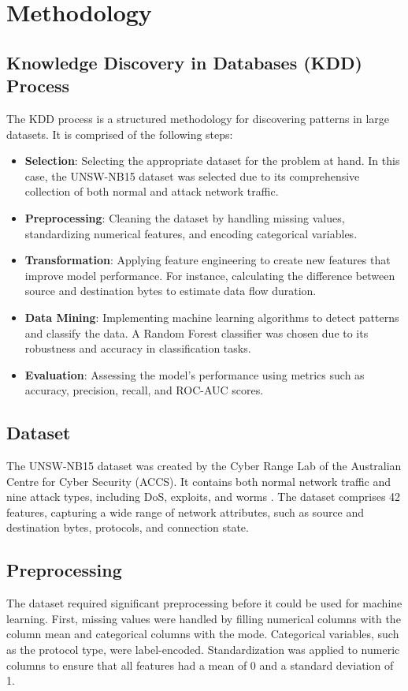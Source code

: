 \documentclass[12pt]{article}
\begin{document}
\section{Methodology}

\subsection{Knowledge Discovery in Databases (KDD) Process}
The KDD process is a structured methodology for discovering patterns in large datasets. It is comprised of the following steps:

\begin{itemize}
    \item \textbf{Selection}: Selecting the appropriate dataset for the problem at hand. In this case, the UNSW-NB15 dataset was selected due to its comprehensive collection of both normal and attack network traffic.
    \item \textbf{Preprocessing}: Cleaning the dataset by handling missing values, standardizing numerical features, and encoding categorical variables.
    \item \textbf{Transformation}: Applying feature engineering to create new features that improve model performance. For instance, calculating the difference between source and destination bytes to estimate data flow duration.
    \item \textbf{Data Mining}: Implementing machine learning algorithms to detect patterns and classify the data. A Random Forest classifier was chosen due to its robustness and accuracy in classification tasks.
    \item \textbf{Evaluation}: Assessing the model’s performance using metrics such as accuracy, precision, recall, and ROC-AUC scores.
\end{itemize}

\subsection{Dataset}
The UNSW-NB15 dataset was created by the Cyber Range Lab of the Australian Centre for Cyber Security (ACCS). It contains both normal network traffic and nine attack types, including DoS, exploits, and worms \cite{moustafa2015unsw}. The dataset comprises 42 features, capturing a wide range of network attributes, such as source and destination bytes, protocols, and connection state.

\subsection{Preprocessing}
The dataset required significant preprocessing before it could be used for machine learning. First, missing values were handled by filling numerical columns with the column mean and categorical columns with the mode. Categorical variables, such as the protocol type, were label-encoded. Standardization was applied to numeric columns to ensure that all features had a mean of 0 and a standard deviation of 1.
\end{document}
